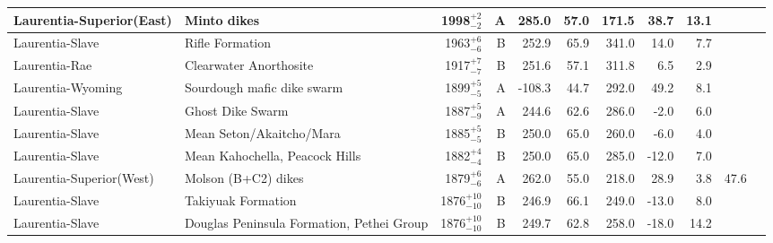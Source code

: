 \begin{ThreePartTable}
\begin{longtable}{p{1.4 in}p{1.2 in}rrrrrrrrp{1.2 in}}
      Laurentia-Superior(East) &                                        Minto dikes &     1998$^{+2}_{-2}$ &      A &     285.0 &      57.0 & 171.5 &  38.7 &      13.1 &          &                                  \cite{Evans2010a} \\ \hline
               Laurentia-Slave &                                    Rifle Formation &     1963$^{+6}_{-6}$ &      B &     252.9 &      65.9 & 341.0 &  14.0 &       7.7 &          &                                  \cite{Evans1981a} \\ \hline
                 Laurentia-Rae &                             Clearwater Anorthosite &     1917$^{+7}_{-7}$ &      B &     251.6 &      57.1 & 311.8 &   6.5 &       2.9 &          &                                  \cite{Halls1999a} \\ \hline
             Laurentia-Wyoming &                         Sourdough mafic dike swarm &     1899$^{+5}_{-5}$ &      A &    -108.3 &      44.7 & 292.0 &  49.2 &       8.1 &          &                                 \cite{Kilian2016b} \\ \hline
               Laurentia-Slave &                                   Ghost Dike Swarm &     1887$^{+5}_{-9}$ &      A &     244.6 &      62.6 & 286.0 &  -2.0 &       6.0 &          &                                 \cite{Buchan2016a} \\ \hline
               Laurentia-Slave &                           Mean Seton/Akaitcho/Mara &     1885$^{+5}_{-5}$ &      B &     250.0 &      65.0 & 260.0 &  -6.0 &       4.0 &          &                               \cite{Mitchell2010c} \\ \hline
               Laurentia-Slave &                     Mean Kahochella, Peacock Hills &     1882$^{+4}_{-4}$ &      B &     250.0 &      65.0 & 285.0 & -12.0 &       7.0 &          &                               \cite{Mitchell2010c} \\ \hline
      Laurentia-Superior(West) &                                Molson (B+C2) dikes &     1879$^{+6}_{-6}$ &      A &     262.0 &      55.0 & 218.0 &  28.9 &       3.8 &        47.6 &                                  \cite{Evans2010a} \\ \hline
               Laurentia-Slave &                                 Takiyuak Formation &   1876$^{+10}_{-10}$ &      B &     246.9 &      66.1 & 249.0 & -13.0 &       8.0 &          &                                 \cite{Irving1979a} \\ \hline
               Laurentia-Slave &          Douglas Peninsula Formation, Pethei Group &   1876$^{+10}_{-10}$ &      B &     249.7 &      62.8 & 258.0 & -18.0 &      14.2 &          &                                 \cite{Irving1979a} \\ \hline

\end{longtable}
\end{ThreePartTable}
